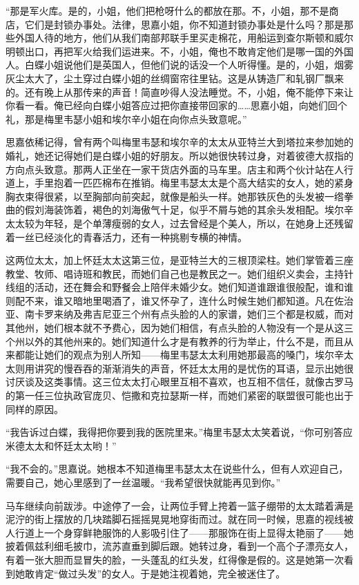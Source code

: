 \par “那是军火库。是的，小姐，他们把枪呀什么的都放在那。不，小姐，那不是商店，它们是封锁办事处。法律，思嘉小姐，你不知道封锁办事处是什么吗？那是那些外国人待的地方，他们从我们南部邦联手里买走棉花，用船运到查尔斯顿和威尔明顿出口，再把军火给我们运进来。不，小姐，俺也不敢肯定他们是哪一国的外国人。白蝶小姐说他们是英国人，但他们说的话没一个人听得懂。是的，小姐，烟雾灰尘太大了，尘土穿过白蝶小姐的丝绸窗帘往里钻。这是从铸造厂和轧钢厂飘来的。还有晚上从那传来的声音！简直吵得人没法睡觉。不，小姐，俺不能停下来让你看一看。俺已经向白蝶小姐答应过把你直接带回家的……思嘉小姐，向她们回个礼，那是梅里韦瑟小姐和埃尔辛小姐在向你点头致意呢。”
\par 思嘉依稀记得，曾有两个叫梅里韦瑟和埃尔辛的太太从亚特兰大到塔拉来参加她的婚礼，她还记得她们是白蝶小姐的好朋友。所以她很快转过身，对着彼德大叔指的方向点头致意。那两人正坐在一家干货店外面的马车里。店主和两个伙计站在人行道上，手里抱着一匹匹棉布在推销。梅里韦瑟太太是个高大结实的女人，她的紧身胸衣束得很紧，以至胸部向前突起，就像是船头一样。她那铁灰色的头发被一绺拳曲的假刘海装饰着，褐色的刘海傲气十足，似乎不屑与她的其余头发相配。埃尔辛太太较为年轻，是个单薄瘦弱的女人，过去曾经是个美人，所以，在她身上还残留着一丝已经淡化的青春活力，还有一种挑剔专横的神情。
\par 这两位太太，加上怀廷太太这第三位，是亚特兰大的三根顶梁柱。她们掌管着三座教堂、牧师、唱诗班和教民，而她们自己也是教民之一。她们组织义卖会，主持针线组的活动，还在舞会和野餐会上陪伴未婚少女。她们知道谁跟谁很般配，谁和谁则配不来，谁又暗地里喝酒了，谁又怀孕了，连什么时候生她们都知道。凡在佐治亚、南卡罗来纳及弗吉尼亚三个州有点头脸的人的家谱，她们三个都是权威，而对其他州，她们根本就不予费心，因为她们相信，有点头脸的人物没有一个是从这三个州以外的其他州来的。她们知道什么才是有教养的行为举止，什么不是，而且从来都能让她们的观点为别人所知——梅里韦瑟太太利用她那最高的嗓门，埃尔辛太太则用讲究的慢吞吞的渐渐消失的声音，怀廷太太用的是忧伤的耳语，显示出她很讨厌谈及这类事情。这三位太太打心眼里互相不喜欢，也互相不信任，就像古罗马的第一任三位执政官庞贝、恺撒和克拉瑟斯一样，而她们紧密的联盟很可能也出于同样的原因。
\par “我告诉过白蝶，我得把你要到我的医院里来。”梅里韦瑟太太笑着说，“你可别答应米德太太和怀廷太太哟！”
\par “我不会的。”思嘉说。她根本不知道梅里韦瑟太太在说些什么，但有人欢迎自己，需要自己，她心里感到了一丝温暖。“我希望很快就能再见到你。”
\par 马车继续向前跋涉。中途停了一会，让两位手臂上挎着一篮子绷带的太太踏着满是泥泞的街上摆放的几块踏脚石摇摇晃晃地穿街而过。就在同一时候，思嘉的视线被人行道上一个身穿鲜艳服饰的人影吸引住了——那服饰在街上显得太艳丽了——她披着佩兹利细毛披巾，流苏直垂到脚后跟。她转过身，看到一个高个子漂亮女人，有着一张大胆而显冒失的脸，一头蓬乱的红头发，红得像是假的。这是她第一次看到她敢肯定“做过头发”的女人。于是她注视着她，完全被迷住了。
